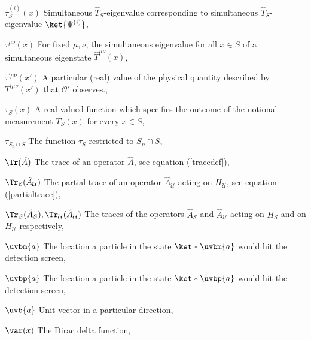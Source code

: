 \begin{thenomenclature}
  \item [{$\tau^{(i)}_S(x)$}]\begingroup Simultaneous $\hat{T}_S$-eigenvalue corresponding to simultaneous $\hat{T}_S$-eigenvalue $\ket{\Psi^{(i)}}$, \nomrefpage{}
  \item [{$\tau^{\mu\nu}(x)$}]\begingroup For fixed $\mu,\nu$, the simultaneous eigenvalue for all $x\in S$ of a simultaneous eigenstate $\hat{T}^{\mu\nu}(x)$, \nomrefpage{}
  \item [{$\tau^{\prime\mu\nu}(x')$}]\begingroup A particular (real) value of the physical quantity described by $T^{\prime\mu\nu}(x')$ that $\mathcal{O}'$ observes., \nomrefpage{}
  \item [{$\tau_S(x)$}]\begingroup A real valued function which specifies the outcome of the notional measurement $T_S(x)$ for every $x\in S$, \nomrefpage{}
  \item [{$\tau_{S_n\cap S}$}]\begingroup The function $\tau_S$ restricted to $S_n\cap S$, \nomrefpage{}
  \item [{$\Tr (\hat{A})$}]\begingroup The trace of an operator $\hat{A}$, see equation (\ref{tracedef}), \nomrefpage{}
  \item [{$\Tr_\mathcal{E}(\hat{A}_\mathcal{U})$}]\begingroup The partial trace of an operator $\hat{A}_\mathcal{U}$ acting on $H_\mathcal{U}$,  see equation (\ref{partialtrace}), \nomrefpage{}
  \item [{$\Tr_\mathcal{S}(\hat{A}_\mathcal{S}), \Tr_\mathcal{U}(\hat{A}_\mathcal{U})$}]\begingroup The traces of the operators $\hat{A}_\mathcal{S}$ and $\hat{A}_\mathcal{U}$ acting  on $H_\mathcal{S}$ and on $H_\mathcal{U}$ respectively, \nomrefpage{}
  \item [{$\uvbm{a}$}]\begingroup The location a particle in the state $\ket*{\uvbm{a}}$ would hit the detection screen, \nomrefpage{}
  \item [{$\uvbp{a}$}]\begingroup The location a particle in the state $\ket*{\uvbp{a}}$ would hit the detection screen, \nomrefpage{}
  \item [{$\uvb{a}$}]\begingroup Unit vector in a particular direction, \nomrefpage{}
  \item [{$\var(x)$}]\begingroup The Dirac delta function, \nomrefpage{}

\end{thenomenclature}
